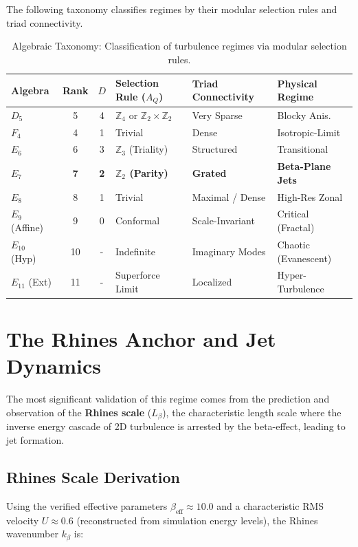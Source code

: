 The following taxonomy classifies regimes by their modular selection rules and triad connectivity.

\begin{table}[H]
\centering
\small
\begin{tabular}{lcclll}
\toprule
\textbf{Algebra} & \textbf{Rank} & $D$ & \textbf{Selection Rule} ($A_Q$) & \textbf{Triad Connectivity} & \textbf{Physical Regime} \\
\midrule
$D_5$ & 5 & 4 & $\mathbb{Z}_4$ or $\mathbb{Z}_2 \times \mathbb{Z}_2$ & Very Sparse & Blocky Anis. \\
$F_4$ & 4 & 1 & Trivial & Dense & Isotropic-Limit \\
$E_6$ & 6 & 3 & $\mathbb{Z}_3$ (Triality) & Structured & Transitional \\
\textbf{$E_7$} & \textbf{7} & \textbf{2} & \textbf{$\mathbb{Z}_2$ (Parity)} & \textbf{Grated} & \textbf{Beta-Plane Jets} \\
$E_8$ & 8 & 1 & Trivial & Maximal / Dense & High-Res Zonal \\
\midrule
$E_9$ (Affine) & 9 & 0 & Conformal & Scale-Invariant & Critical (Fractal) \\
$E_{10}$ (Hyp) & 10 & - & Indefinite & Imaginary Modes & Chaotic (Evanescent) \\
$E_{11}$ (Ext) & 11 & - & Superforce Limit & Localized & Hyper-Turbulence \\
\bottomrule
\end{tabular}
\caption{Algebraic Taxonomy: Classification of turbulence regimes via modular selection rules.}
\label{tab:algebraic_taxonomy}
\end{table}

\section{The Rhines Anchor and Jet Dynamics}

The most significant validation of this regime comes from the prediction and observation of the \textbf{Rhines scale} ($L_\beta$), the characteristic length scale where the inverse energy cascade of 2D turbulence is arrested by the beta-effect, leading to jet formation.

\subsection{Rhines Scale Derivation}

Using the verified effective parameters $\beta_{\text{eff}} \approx 10.0$ and a characteristic RMS velocity $U \approx 0.6$ (reconstructed from simulation energy levels), the Rhines wavenumber $k_\beta$ is:

